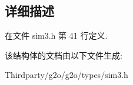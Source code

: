 \subsection{详细描述}


在文件 sim3.\-h 第 41 行定义.



该结构体的文档由以下文件生成\-:\begin{DoxyCompactItemize}
\item 
Thirdparty/g2o/g2o/types/sim3.\-h\end{DoxyCompactItemize}
